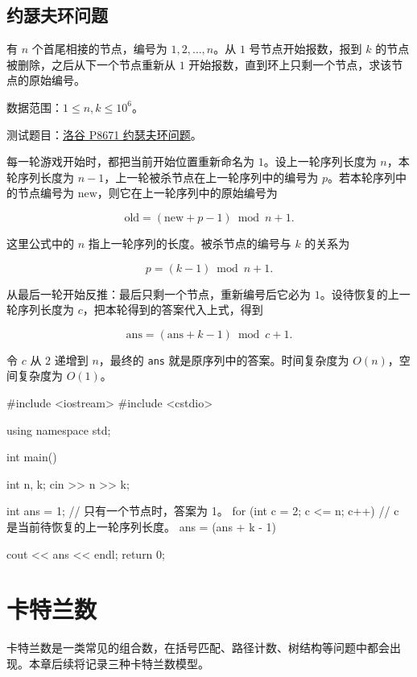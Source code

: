 \documentclass[UTF8,a4paper,11pt]{ctexart}
\newcommand{\topic}[1]{%
  \par\needspace{3\baselineskip}\vspace{0.45em}%
  \noindent{\bfseries\color{Primary}#1}\par\vspace{0.12em}%
}
\begin{document}
\subsection{约瑟夫环问题}

\topic{题目}

有 $n$ 个首尾相接的节点，编号为 $1,2,\ldots,n$。从 $1$ 号节点开始报数，报到 $k$ 的节点被删除，之后从下一个节点重新从 $1$ 开始报数，直到环上只剩一个节点，求该节点的原始编号。

数据范围：$1\le n,k\le10^6$。

测试题目：\href{https://www.luogu.com.cn/problem/P8671}{洛谷 P8671 约瑟夫环问题}。

\topic{递推推导}

每一轮游戏开始时，都把当前开始位置重新命名为 $1$。设上一轮序列长度为 $n$，本轮序列长度为 $n-1$，上一轮被杀节点在上一轮序列中的编号为 $p$。若本轮序列中的节点编号为 $\mathrm{new}$，则它在上一轮序列中的原始编号为

\[
\mathrm{old}=(\mathrm{new}+p-1)\bmod n+1.
\]

这里公式中的 $n$ 指上一轮序列的长度。被杀节点的编号与 $k$ 的关系为

\[
p=(k-1)\bmod n+1.
\]

从最后一轮开始反推：最后只剩一个节点，重新编号后它必为 $1$。设待恢复的上一轮序列长度为 $c$，把本轮得到的答案代入上式，得到

\[
\mathrm{ans}=(\mathrm{ans}+k-1)\bmod c+1.
\]

令 $c$ 从 $2$ 递增到 $n$，最终的 \texttt{ans} 就是原序列中的答案。时间复杂度为 $O(n)$，空间复杂度为 $O(1)$。

\begin{CodeBlock}
#include <iostream>
#include <cstdio>

using namespace std;

int main() {
    int n, k;
    cin >> n >> k;

    int ans = 1; // 只有一个节点时，答案为 1。
    for (int c = 2; c <= n; c++) {
        // c 是当前待恢复的上一轮序列长度。
        ans = (ans + k - 1) %
    }

    cout << ans << endl;
    return 0;
}
\end{CodeBlock}

\clearpage
\section{卡特兰数}

卡特兰数是一类常见的组合数，在括号匹配、路径计数、树结构等问题中都会出现。本章后续将记录三种卡特兰数模型。
\end{document}
